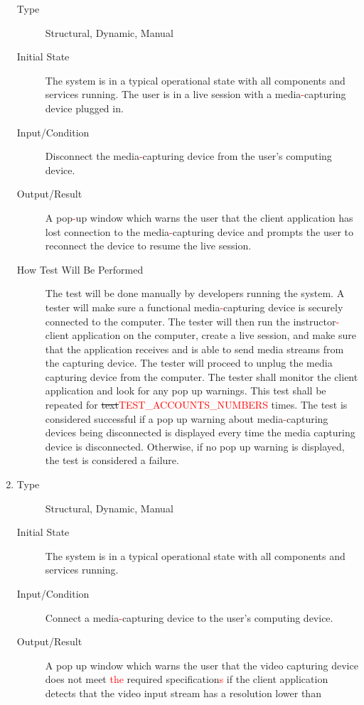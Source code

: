 \documentclass[12pt, titlepage]{article}
\newcommand{\rt}[1]{\textcolor{red}{#1}}
\begin{document}
\begin{enumerate}[NFR-T1]
  \begin{description}
  \item[Type] Structural, Dynamic, Manual
  \item[Initial State] The system is in a typical operational state with all
    components and services running. The user is in a live session with a 
    media\rt{-}capturing device plugged in.
  \item[Input/Condition] Disconnect the media\rt{-}capturing device from the user’s
    computing device.
  \item[Output/Result] A pop\rt{-}up window which warns the user that the client
    application has lost connection to the media\rt{-}capturing device and prompts
    the user to reconnect the device to resume the live session.
  \item[How Test Will Be Performed] The test will be done manually by developers
    running the system. A tester will make sure a functional media\rt{-}capturing
    device is securely connected to the computer. The tester will then run the
    instructor\rt{-}client application on the computer, create a live session, and
    make sure that the application receives and is able to send media streams
    from the capturing device. The tester will proceed to unplug the media
    capturing device from the computer. The tester shall monitor the client
    application and look for any pop up warnings. This test shall be repeated
    for \sout{text}\rt{TEST\_ACCOUNTS\_NUMBERS} times. The test is considered successful if a pop up warning about
    media\rt{-}capturing devices being disconnected is displayed every time the media
    capturing device is disconnected. Otherwise, if no pop up warning is
    displayed, the test is considered a failure.
  \end{description}
\item \label{NFRT11}
  \begin{description}
  \item[Type] Structural, Dynamic, Manual
  \item[Initial State] The system is in a typical operational state with all
    components and services running.
  \item[Input/Condition] Connect a media\rt{-}capturing device to the user’s computing
    device.
  \item[Output/Result] A pop up window which warns the user that the video
    capturing device does not meet \rt{the} required specification\rt{s} if the client
    application detects that the video input stream has a resolution lower than

\end{description}
\end{enumerate}
\end{document}
